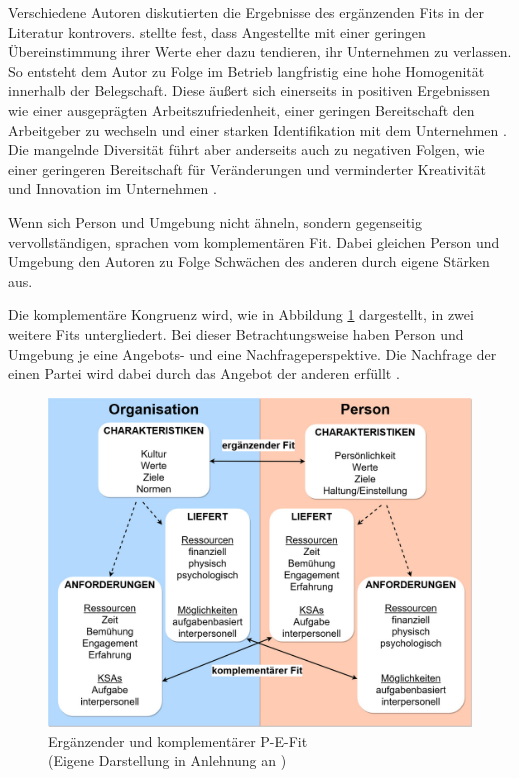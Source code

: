 Verschiedene Autoren diskutierten die Ergebnisse des ergänzenden Fits in der Literatur kontrovers. \textcite[S. 6]{schneider:1987} stellte fest, dass Angestellte mit einer geringen Übereinstimmung ihrer Werte eher dazu tendieren, ihr Unternehmen zu verlassen. So entsteht dem Autor zu Folge im Betrieb langfristig eine hohe Homogenität innerhalb der Belegschaft. Diese äußert sich einerseits in positiven Ergebnissen wie einer ausgeprägten Arbeitszufriedenheit, einer geringen Bereitschaft den Arbeitgeber zu wechseln und einer starken Identifikation mit dem Unternehmen \cite[S. 25ff.]{kristof:1996}\cite[S. 5]{su:2015}. Die mangelnde Diversität führt aber anderseits auch zu negativen Folgen, wie einer geringeren Bereitschaft für Veränderungen \cite[S. 10]{schneider:1987} und verminderter Kreativität und Innovation im Unternehmen \cite[S. 7]{chatman:1998}.

Wenn sich Person und Umgebung nicht ähneln, sondern gegenseitig vervollständigen, sprachen \textcite[S. 4]{muchinsky:1987} vom komplementären Fit. Dabei gleichen Person und Umgebung den Autoren zu Folge Schwächen des anderen durch eigene Stärken aus.

Die komplementäre Kongruenz wird, wie in Abbildung \ref{fig:personEnvironmentFit:supplementaryUndComplementary:abb1} dargestellt, in zwei weitere Fits untergliedert. Bei dieser Betrachtungsweise haben Person und Umgebung je eine Angebots- und eine Nachfrageperspektive. Die Nachfrage der einen Partei wird dabei durch das Angebot der anderen erfüllt \cite[S. 2ff.]{caplan:1987}\cite[S. 2f.]{edwards:1991}\cite[S. 2]{copingAndAdaption:1974}.

\begin{figure}[h]
	\centering
	\includegraphics[width=1\textwidth]{gfx/supplementaryComplementaryFit.jpg}
	\caption{Ergänzender und komplementärer P-E-Fit\\
		(Eigene Darstellung in Anlehnung an \cite[S. 4]{kristof:1996})}
	\label{fig:personEnvironmentFit:supplementaryUndComplementary:abb1}
\end{figure}

